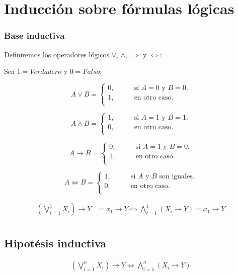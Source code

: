 \documentclass[11pt]{utalcaDoc}
\numberwithin{equation}{section}
\begin{document}
			\newpage
\section{Inducción sobre fórmulas lógicas}
\subsubsection{Base inductiva}
Definiremos los operadores lógicos $\vee$, $\wedge$, $\Rightarrow$ y $\Leftrightarrow$:

Sea $1=Verdadero$ y $0=Falso$:

\[ A \vee B =
 \begin{cases}
 0,	\qquad& \text{si $A=0$ y $B=0$}.\\
 1,	\qquad& \text{en otro caso}.\\
\end{cases} \]

\[ A \wedge B =
 \begin{cases}
 1, 	\qquad& \text{si $A=1$ y $B=1$}.\\
 0,	 	\qquad& \text{en otro caso}.\\
\end{cases} \]

\[ A \rightarrow B =
 \begin{cases}
 0,	 	\qquad& \text{si $A=1$ y $B=0$}.\\
 1,		\qquad& \text{en otro caso}.\\
\end{cases} \]

\[ A \Leftrightarrow B =
 \begin{cases}
 1, 	\qquad& \text{si $A$ y $B$ son iguales}.\\
 0,	 	\qquad& \text{en otro caso}.\\
\end{cases} \]


\begin{align}
\left(\bigvee\limits_{i=1}^{1}X_i\right)\rightarrow Y &= x_1 \rightarrow Y \Leftrightarrow \bigwedge\limits_{i=1}^{1}(X_i\rightarrow Y) = x_1\rightarrow Y \label{EQ:ORATORIA_BI_1}\\
\end{align}

\subsection{Hipotésis inductiva} 
\begin{align}
\left(\bigvee\limits_{i=1}^{n}X_i\right)\rightarrow Y \Leftrightarrow \bigwedge\limits_{i=1}^{n}(X_i\rightarrow Y) 
\end{align}
\end{document}

